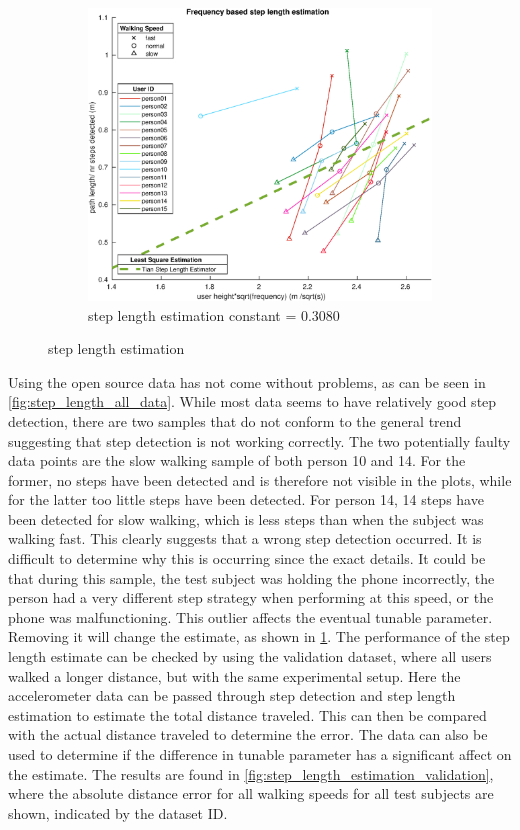 \begin{figure}[H]
\begin{subfigure}[t]{.45\textwidth}
		\includegraphics[width=0.95\linewidth]{images/20201028_1051_step_length_good_data}
		\caption{step length estimation constant = 0.3080}
		\label{fig:step_length_without_faults}
	\end{subfigure}
	\caption{step length estimation}
	\label{fig:step_length_estimation}
\end{figure}
Using the open source data has not come without problems, as can be seen in \cref{fig:step_length_all_data}. While most data seems to have relatively good step detection, there are two samples that do not conform to the general trend suggesting that step detection is not working correctly. The two potentially faulty data points are the slow walking sample of both person 10 and 14. For the former, no steps have been detected and is therefore not visible in the plots, while for the latter too little steps have been detected. For person 14, 14 steps have been detected for slow walking, which is less steps than when the subject was walking fast. This clearly suggests that a wrong step detection occurred. It is difficult to determine why this is occurring since the exact details. It could be that during this sample, the test subject was holding the phone incorrectly, the person had a very different step strategy when performing at this speed, or the phone was malfunctioning. This outlier affects the eventual tunable parameter. Removing it will change the estimate, as shown in \cref{fig:step_length_without_faults}. The performance of the step length estimate can be checked by using the validation dataset, where all users walked a longer distance, but with the same experimental setup. Here the accelerometer data can be passed through step detection and step length estimation to estimate the total distance traveled. This can then be compared with the actual distance traveled to determine the error. The data can also be used to determine if the difference in tunable parameter has a significant affect on the estimate. The results are found in  \cref{fig:step_length_estimation_validation}, where the absolute distance error for all walking speeds for all test subjects are shown, indicated by the dataset ID.
